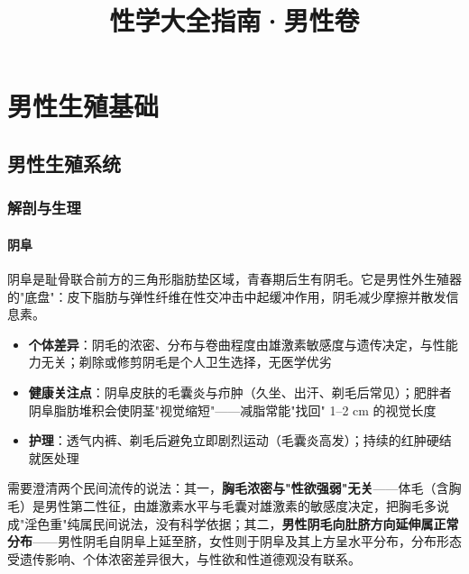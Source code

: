 \documentclass[12pt,a4paper,twoside]{ctexbook}
\title{\hei\zihao{0} 性学大全指南·男性卷}
\author{}
\date{}
\begin{document}
\frontmatter

\maketitle

\tableofcontents
\listoffigures
\listoftables

\mainmatter

\part{男性生殖基础}

\chapter{男性生殖系统}

\section{解剖与生理}

\subsection{阴阜}


阴阜是耻骨联合前方的三角形脂肪垫区域，青春期后生有阴毛。它是男性外生殖器的"底盘"：皮下脂肪与弹性纤维在性交冲击中起缓冲作用，阴毛减少摩擦并散发信息素。

\begin{itemize}
	\item \textbf{个体差异}：阴毛的浓密、分布与卷曲程度由雄激素敏感度与遗传决定，与性能力无关；剃除或修剪阴毛是个人卫生选择，无医学优劣
	\item \textbf{健康关注点}：阴阜皮肤的毛囊炎与疖肿（久坐、出汗、剃毛后常见）；肥胖者阴阜脂肪堆积会使阴茎"视觉缩短"——减脂常能"找回" 1--2 cm 的视觉长度
	\item \textbf{护理}：透气内裤、剃毛后避免立即剧烈运动（毛囊炎高发）；持续的红肿硬结就医处理
\end{itemize}

需要澄清两个民间流传的说法：其一，\textbf{胸毛浓密与"性欲强弱"无关}——体毛（含胸毛）是男性第二性征，由雄激素水平与毛囊对雄激素的敏感度决定，把胸毛多说成"淫色重"纯属民间说法，没有科学依据；其二，\textbf{男性阴毛向肚脐方向延伸属正常分布}——男性阴毛自阴阜上延至脐，女性则于阴阜及其上方呈水平分布，分布形态受遗传影响、个体浓密差异很大，与性欲和性道德观没有联系。
\end{document}
